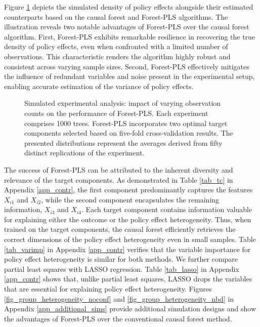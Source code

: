 \documentclass[12pt]{article}
\begin{document}
Figure \ref{fig_group_heterogeneity} depicts the simulated density of policy effects alongside their estimated counterparts based on the causal forest and Forest-PLS algorithms. The illustration reveals two notable advantages of Forest-PLS over the causal forest algorithm. First, Forest-PLS exhibits remarkable resilience in recovering the true density of policy effects, even when confronted with a limited number of observations. This characteristic renders the algorithm highly robust and consistent across varying sample sizes. Second, Forest-PLS effectively mitigates the influence of redundant variables and noise present in the experimental setup, enabling accurate estimation of the variance of policy effects.

\begin{figure}[H]
	\centering
    \quad
     \quad 
	\caption{Simulated experimental analysis: impact of varying observation counts on the performance of Forest-PLS. Each experiment comprises 1000 trees. Forest-PLS incorporates two optimal target components selected based on five-fold cross-validation results. The presented distributions represent the averages derived from fifty distinct replications of the experiment.  }\label{fig_group_heterogeneity}
\end{figure}

The success of Forest-PLS can be attributed to the inherent diversity and relevance of the target components.  As demonstrated in Table \ref{tab_tc} in Appendix \ref{app_contr}, the first component predominantly captures the features $X_{i1}$ and $X_{i2}$, while the second component encapsulates the remaining information, $X_{i3}$ and $X_{i4}$. Each target component contains information valuable for explaining either the outcome or the policy effect heterogeneity. Thus, when trained on the target components, the causal forest efficiently retrieves the correct dimensions of the policy effect heterogeneity even in small samples. Table \ref{tab_varimp} in Appendix \ref{app_contr} verifies that the variable importance for policy effect heterogeneity is similar for both methods. We further compare partial least squares with LASSO regression. Table \ref{tab_lasso} in Appendix \ref{app_contr} shows that, unlike partial least squares, LASSO drops the variables that are essential for explaining policy effect heterogeneity. 
Figures \ref{fig_group_heterogeneity_noconf} and \ref{fig_group_heterogeneity_nbd} in Appendix \ref{app_additional_sims} provide additional simulation designs and show the advantages of Forest-PLS over the conventional causal forest method. 
\end{document}
